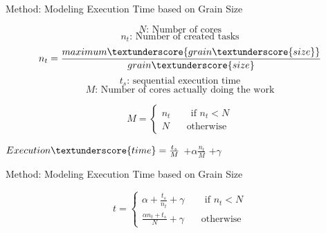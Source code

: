 \documentclass[10pt]{beamer}
\begin{document}
\begin{frame}{Method: Modeling Execution Time based on Grain Size}
	\begin{outline}	

		$$N\text{: Number of cores}$$	
		$$n_t \text{: Number of created tasks}	$$
		$$n_t=\frac{maximum\textunderscore{grain\textunderscore{size}}}{grain\textunderscore{size}}$$
		$$t_s\text{: sequential execution time}$$
		$$M\text{: Number of cores actually doing the work}$$

		$$M=\left\{
		\begin{aligned}
		n_t  \:\:\:\:\:\:\:\:      \text{ if } n_t<N\\
		N\:\:\:\:\:\:\:\:     \text{otherwise}
		\end{aligned}
		\right.$$
		
		\pause
		$Execution\textunderscore{time}=\frac{t_s}{M}$
		\pause
		$+\alpha\frac{n_t}{M}$
		\pause
		$+\gamma$
	\end{outline}
\end{frame}

\begin{frame}{Method: Modeling Execution Time based on Grain Size}
\begin{outline}		
	$$t=\left\{
	\begin{aligned}
		\alpha+\frac{t_s}{n_t}+\gamma  \:\:\:\:\:\:\:\:      \text{ if } n_t<N\\
		\frac{\alpha{n_t}+t_s}{N}+\gamma\:\:\:\:\:\:\:\:     \text{otherwise}
	\end{aligned}
	\right.$$


\end{outline}
\end{frame}
\end{document}
